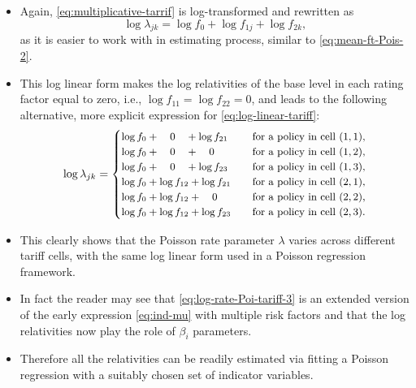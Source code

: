 \documentclass[ignorenonframetext,]{beamer}
\begin{document}
\begin{frame}[allowframebreaks]
\begin{itemize}
\item Again, \eqref{eq:multiplicative-tarrif} is log-transformed and rewritten as
\begin{equation}
\log \lambda_{jk}= \log f_0 + \log f_{1j} + \log f_{2k},
\label{eq:log-linear-tariff}
\end{equation} 
as it is easier to work with in estimating process, similar to \eqref{eq:mean-ft-Pois-2}. 
\item This log linear form makes the log relativities of the base level in each rating factor equal to zero, i.e., $\log f_{11}=\log f_{22}=0$, and leads to the following alternative, more explicit expression for \eqref{eq:log-linear-tariff}:
\begin{equation}
\small{
\log \lambda_{jk}=\begin{cases}
\log f_0 + \quad 0 \quad + \log f_{21} \quad \,\,& \text{for a policy in cell }(1,1), \\
\log f_0+ \quad 0 \quad +\quad 0& \text{for a policy in cell }(1,2), \\
\log f_0+ \quad 0 \quad +\log f_{23}& \text{for a policy in cell }(1,3), \\
\log f_0+\log f_{12}+  \log f_{21} & \text{for a policy in cell }(2,1), \\
\log f_0+\log f_{12}+\quad 0 \quad \,\,& \text{for a policy in cell }(2,2), \\
\log f_0+\log f_{12}+\log f_{23}& \text{for a policy in cell }(2,3). \\
\end{cases}
}
\label{eq:log-rate-Poi-tariff-3}
\end{equation}

\framebreak 

\item This clearly shows that the Poisson rate parameter $\lambda$ varies across different tariff cells, with the same log linear form used in a Poisson regression framework.
\item In fact the reader may see that \eqref{eq:log-rate-Poi-tariff-3} is  an extended version of the early expression \eqref{eq:ind-mu} with multiple risk factors and that the log relativities now play the role of $\beta_i$ parameters. 
\item Therefore all the relativities can be readily estimated via fitting a Poisson regression with a suitably chosen set of indicator variables.
\end{itemize}

\end{frame}
\end{document}
